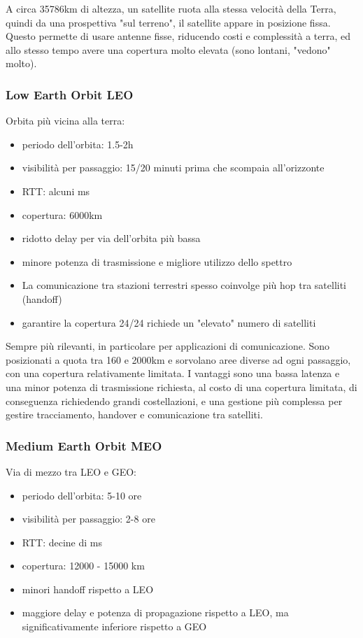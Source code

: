A circa 35786km di altezza, un satellite ruota alla stessa velocità della Terra, quindi da una prospettiva "sul terreno", il satellite appare in posizione fissa. Questo permette di usare antenne fisse, riducendo costi e complessità a terra, ed allo stesso tempo avere una copertura molto elevata (sono lontani, "vedono" molto).\\

\subsubsection{Low Earth Orbit LEO}

Orbita più vicina alla terra: 
\begin{itemize}
	\item periodo dell'orbita: 1.5-2h
	\item visibilità per passaggio: 15/20 minuti prima che scompaia all'orizzonte
	\item RTT: alcuni ms
	\item copertura: 6000km
	\item ridotto delay per via dell'orbita più bassa
	\item minore potenza di trasmissione e migliore utilizzo dello spettro
	\item La comunicazione tra stazioni terrestri spesso coinvolge più hop tra satelliti (handoff)
	\item garantire la copertura 24/24 richiede un "elevato" numero di satelliti
\end{itemize}

Sempre più rilevanti, in particolare per applicazioni di comunicazione. Sono posizionati a quota tra 160 e 2000km e sorvolano aree diverse ad ogni passaggio, con una copertura relativamente limitata. I vantaggi sono una bassa latenza e una minor potenza di trasmissione richiesta, al costo di una copertura limitata, di conseguenza richiedendo grandi costellazioni, e una gestione più complessa per gestire tracciamento, handover e comunicazione tra satelliti.\\

\subsubsection{Medium Earth Orbit MEO}

Via di mezzo tra LEO e GEO:
\begin{itemize}
	\item periodo dell'orbita: 5-10 ore
	\item visibilità per passaggio: 2-8 ore
	\item RTT: decine di ms
	\item copertura: 12000 - 15000 km
	\item minori handoff rispetto a LEO
	\item maggiore delay e potenza di propagazione rispetto a LEO, ma significativamente inferiore rispetto a GEO
\end{itemize}

